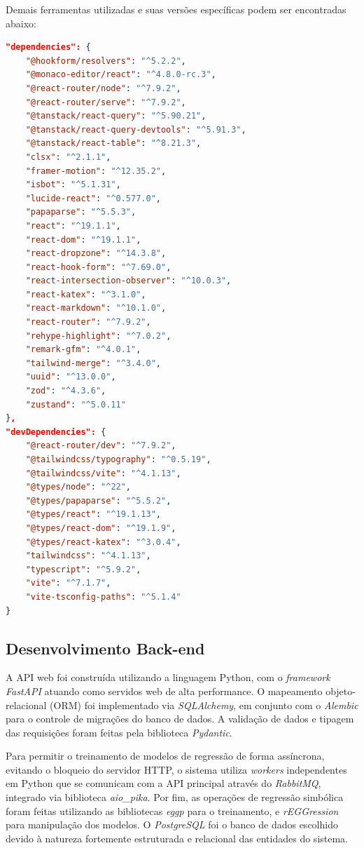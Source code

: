 Demais ferramentas utilizadas e suas versões específicas podem ser encontradas abaixo:
\begin{lstlisting}[language=json, caption=Bibliotecas utilizadas no front-end e suas versões]
"dependencies": {
    "@hookform/resolvers": "^5.2.2",
    "@monaco-editor/react": "^4.8.0-rc.3",
    "@react-router/node": "^7.9.2",
    "@react-router/serve": "^7.9.2",
    "@tanstack/react-query": "^5.90.21",
    "@tanstack/react-query-devtools": "^5.91.3",
    "@tanstack/react-table": "^8.21.3",
    "clsx": "^2.1.1",
    "framer-motion": "^12.35.2",
    "isbot": "^5.1.31",
    "lucide-react": "^0.577.0",
    "papaparse": "^5.5.3",
    "react": "^19.1.1",
    "react-dom": "^19.1.1",
    "react-dropzone": "^14.3.8",
    "react-hook-form": "^7.69.0",
    "react-intersection-observer": "^10.0.3",
    "react-katex": "^3.1.0",
    "react-markdown": "^10.1.0",
    "react-router": "^7.9.2",
    "rehype-highlight": "^7.0.2",
    "remark-gfm": "^4.0.1",
    "tailwind-merge": "^3.4.0",
    "uuid": "^13.0.0",
    "zod": "^4.3.6",
    "zustand": "^5.0.11"
},
"devDependencies": {
    "@react-router/dev": "^7.9.2",
    "@tailwindcss/typography": "^0.5.19",
    "@tailwindcss/vite": "^4.1.13",
    "@types/node": "^22",
    "@types/papaparse": "^5.5.2",
    "@types/react": "^19.1.13",
    "@types/react-dom": "^19.1.9",
    "@types/react-katex": "^3.0.4",
    "tailwindcss": "^4.1.13",
    "typescript": "^5.9.2",
    "vite": "^7.1.7",
    "vite-tsconfig-paths": "^5.1.4"
}
\end{lstlisting}

\subsection{Desenvolvimento Back-end}
A API web foi construída utilizando a linguagem Python, com o \textit{framework FastAPI} atuando como servidos web de alta performance. O mapeamento objeto-relacional (ORM) foi implementado via \textit{SQLAlchemy}, em conjunto com o \textit{Alembic} para o controle de migrações do banco de dados. A validação de dados e tipagem das requisições foram feitas pela biblioteca \textit{Pydantic}.

Para permitir o treinamento de modelos de regressão de forma assíncrona, evitando o bloqueio do servidor HTTP, o sistema utiliza \textit{workers} independentes em Python que se comunicam com a API principal através do \textit{RabbitMQ}, integrado via biblioteca \textit{aio\_pika}. Por fim, as operações de regressão simbólica foram feitas utilizando as bibliotecas \textit{eggp} para o treinamento, e \textit{rEGGression} para manipulação dos modelos. O \textit{PostgreSQL} foi o banco de dados escolhido devido à natureza fortemente estruturada e relacional das entidades do sistema.

